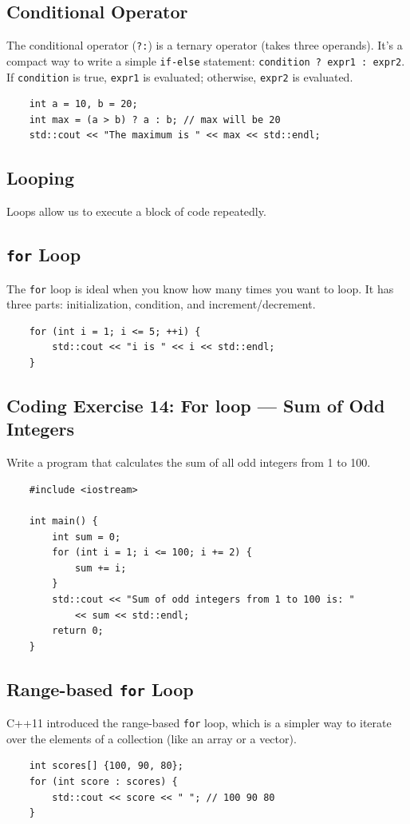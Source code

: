 \subsection{Conditional Operator}
The conditional operator (\texttt{?:}) is a ternary operator (takes three operands). It's a compact way to write a simple \texttt{if-else} statement: \texttt{condition ? expr1 : expr2}. If \texttt{condition} is true, \texttt{expr1} is evaluated; otherwise, \texttt{expr2} is evaluated.
\begin{lstlisting}
	int a = 10, b = 20;
	int max = (a > b) ? a : b; // max will be 20
	std::cout << "The maximum is " << max << std::endl;
\end{lstlisting}

\subsection{Looping}
Loops allow us to execute a block of code repeatedly.

\subsection{\texttt{for} Loop}
The \texttt{for} loop is ideal when you know how many times you want to loop. It has three parts: initialization, condition, and increment/decrement.
\begin{lstlisting}
	for (int i = 1; i <= 5; ++i) {
		std::cout << "i is " << i << std::endl;
	}
\end{lstlisting}

\subsection{Coding Exercise 14: For loop --- Sum of Odd Integers}
Write a program that calculates the sum of all odd integers from 1 to 100.
\begin{lstlisting}
	#include <iostream>

	int main() {
		int sum = 0;
		for (int i = 1; i <= 100; i += 2) {
			sum += i;
		}
		std::cout << "Sum of odd integers from 1 to 100 is: "
			<< sum << std::endl;
		return 0;
	}
\end{lstlisting}

\subsection{Range-based \texttt{for} Loop}
C++11 introduced the range-based \texttt{for} loop, which is a simpler way to iterate over the elements of a collection (like an array or a vector).
\begin{lstlisting}
	int scores[] {100, 90, 80};
	for (int score : scores) {
		std::cout << score << " "; // 100 90 80
	}
\end{lstlisting}

